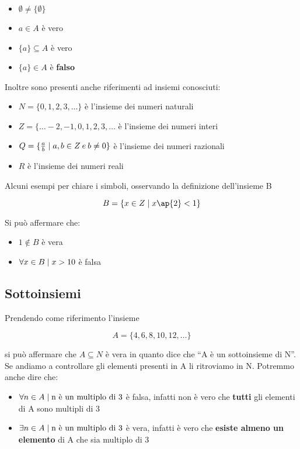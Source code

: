 \documentclass[12pt,a4paper]{article}
\newcommand{\Setsuchthat}{\;\ifnum\currentgrouptype=16 \middle\fi|\;} %
\begin{document}
  \begin{itemize}
    \item $ \emptyset \neq \{\emptyset\} $
    \item $ a \in A $ è vero
    \item $ \{a\} \subseteq A $ è vero
    \item $ \{a\} \in A $ è \textbf{falso}
  \end{itemize}

  Inoltre sono presenti anche riferimenti ad insiemi conosciuti:

  \begin{itemize}
    \item $ N = \{0, 1, 2, 3, \ldots\} $ è l'insieme dei numeri naturali
    \item $ Z = \{ \ldots -2, -1, 0, 1, 2, 3, \ldots $ è l'insieme dei numeri interi
    \item $ Q  = \{\frac{a}{b} \Setsuchthat a,b \in Z\:e\:b \neq 0\} $ è l'insieme dei numeri razionali
    \item $ R $ è l'insieme dei numeri reali
  \end{itemize}

  Alcuni esempi per chiare i simboli, osservando la definizione dell'insieme B

  \begin{equation}
    B = \{x \in Z \Setsuchthat x\ap{2} < 1\}
  \end{equation}

  Si può affermare che:
  \begin{itemize}
    \item $ 1 \notin B $ è vera
    \item $ \forall x \in B \Setsuchthat x > 10 $ è falsa 
  \end{itemize}

  \subsection{Sottoinsiemi}
  Prendendo come riferimento l'insieme

  \begin{equation}
    A = \{4, 6, 8, 10, 12, \ldots\}
  \end{equation}

  si può affermare che $ A \subseteq N $ è vera in quanto dice che ``A è un sottoinsieme
  di N''. Se andiamo a controllare gli elementi presenti in A li ritroviamo in N. Potremmo anche dire che:

  \begin{itemize}
    \item $ \forall n \in A \Setsuchthat \text{n è un multiplo di 3} $ è falsa, infatti non è vero che \textbf{tutti} gli elementi di A sono multipli di 3

    \item $ \exists n \in A \Setsuchthat \text{n è un multiplo di 3} $ è vera, infatti è vero che \textbf{esiste almeno un elemento} di A che sia multiplo di 3
  \end{itemize}
  
\end{document}

